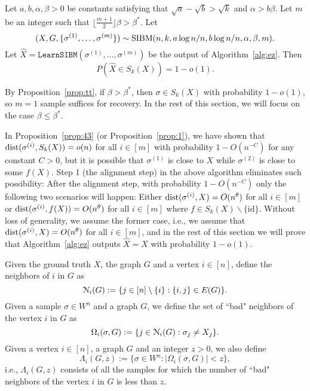 \documentclass{article}
\begin{document}
\begin{proposition} \label{prop:nr}
	Let $a,b,\alpha,\beta> 0$ be constants satisfying that $\sqrt{a}-\sqrt{b} > \sqrt{k}$ and $\alpha>b\beta$.
	Let $m$ be an integer such that $\lfloor \frac{m + 1}{2} \rfloor \beta>\beta^\ast$.
	Let 
	$$
	(X,G,\{\sigma^{(1)},\dots,\sigma^{(m)}\})\sim \operatorname{SIBM}(n,k, a\log n/n, b\log n/n,\alpha,\beta, m) .
	$$
	Let $\hat{X}=\texttt{LearnSIBM}(\sigma^{(1)},\dots,\sigma^{(m)})$ be the output of Algorithm~\ref{alg:ez}. Then
	$$
	P(\hat{X} \in S_k(X)) = 1-o(1) .
	$$
\end{proposition}

By Proposition~\ref{prop:tt},
if $\beta>\beta^\ast$, then $\sigma \in S_k(X) $ with probability $1-o(1)$, so $m=1$ sample suffices for recovery. In the rest of this section, we will focus on the case $\beta\le \beta^\ast$.

In Proposition~\ref{prop:43} (or Proposition~\ref{prop:1}),
we have shown that $\operatorname{dist}(\sigma^{(i)}, S_k(X)) =o(n)$
for all $i\in[m]$ with probability $1-O(n^{-C})$ for any constant $C>0$,
but it is possible that $\sigma^{(1)}$ is close to $X$ while $\sigma^{(2)}$ is close to some $f(X)$.
Step 1 (the alignment step) in the above algorithm eliminates such possibility:
After the alignment step, with probability $1-O(n^{-C})$ only the following two scenarios will happen:
Either
$\operatorname{dist}(\sigma^{(i)}, X)=O(n^{\theta})$ for all $i\in[m]$ or $\operatorname{dist}(\sigma^{(i)}, f(X))=O(n^{\theta})$ for all $i\in[m]$
where $f \in S_k(X) \backslash \{\textrm{id}\}$.
Without loss of generality, we assume the former case, i.e., we assume that
$\operatorname{dist}(\sigma^{(i)}, X) = O(n^{\theta})$ for all $i\in[m]$,
and in the rest of this section we will prove that Algorithm~\ref{alg:ez} outputs $\hat{X}=X$ with probability $1-o(1)$.


Given the ground truth $X$, the graph $G$ and a vertex $i\in[n]$, define the neighbors of $i$ in $G$ as 
\begin{equation} \label{eq:ngbi}
\mathcal{N}_i(G) := \{j\in[n]\setminus\{i\}:
\{i,j\}\in E(G) \} .
\end{equation}
Given a sample $\sigma\in W^n$ and a graph $G$,  we define the set of ``bad" neighbors of the vertex $i$ in $G$ as
$$
\Omega_i(\sigma,G):=\{j\in \mathcal{N}_i(G): 
\sigma_j \neq X_j \} .
$$
Given a vertex $i\in[n]$, a graph $G$ and an integer $z>0$, we also define
$$
\Lambda_i(G, z):=\{ \sigma\in W^n: |\Omega_i(\sigma,G)| < z \} ,
$$
i.e., $\Lambda_i(G, z)$ consists of all the samples for which the number of ``bad" neighbors of the vertex $i$ in $G$ is less than $z$.
\end{document}
